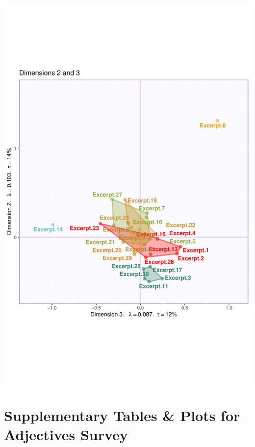 \documentclass[
]{article}
\begin{document}
\begin{center}\includegraphics{MusDes_Supplementary_files/figure-latex/excerptsmaps23-2} \end{center}

\hypertarget{supplementary-tables-plots-for-adjectives-survey}{%
\section{Supplementary Tables \& Plots for Adjectives
Survey}\label{supplementary-tables-plots-for-adjectives-survey}}
\end{document}
